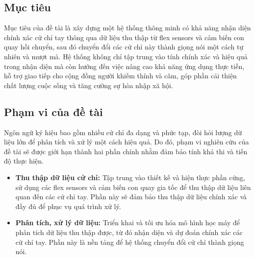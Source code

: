 \subsection{Mục tiêu}
\indent Mục tiêu của đề tài là xây dựng một hệ thống thông minh có khả năng nhận diện chính xác cử chỉ tay thông qua dữ liệu thu thập từ flex sensors và cảm biến con quay hồi chuyển, sau đó chuyển đổi các cử chỉ này thành giọng nói một cách tự nhiên và mượt mà. Hệ thống không chỉ tập trung vào tính chính xác và hiệu quả trong nhận diện mà còn hướng đến việc nâng cao khả năng ứng dụng thực tiễn, hỗ trợ giao tiếp cho cộng đồng người khiếm thính và câm, góp phần cải thiện chất lượng cuộc sống và tăng cường sự hòa nhập xã hội.
\subsection{Phạm vi của đề tài}
\indent Ngôn ngữ ký hiệu bao gồm nhiều cử chỉ đa dạng và phức tạp, đòi hỏi lượng dữ liệu lớn để phân tích và xử lý một cách hiệu quả. Do đó, phạm vi nghiên cứu của đề tài sẽ được giới hạn thành hai phần chính nhằm đảm bảo tính khả thi và tiến độ thực hiện.
\begin{itemize}
    \item \textbf{Thu thập dữ liệu cử chỉ:} Tập trung vào thiết kế và hiện thực phần cứng, sử dụng các flex sensors và cảm biến con quay gia tốc để thu thập dữ liệu liên quan đến các cử chỉ tay. Phần này sẽ đảm bảo thu thập dữ liệu chính xác và đầy đủ để phục vụ quá trình xử lý.
    \item \textbf{Phân tích, xử lý dữ liệu:} Triển khai và tối ưu hóa mô hình học máy để phân tích dữ liệu thu thập được, từ đó nhận diện và dự đoán chính xác các cử chỉ tay. Phần này là nền tảng để hệ thống chuyển đổi cử chỉ thành giọng nói.
\end{itemize}


